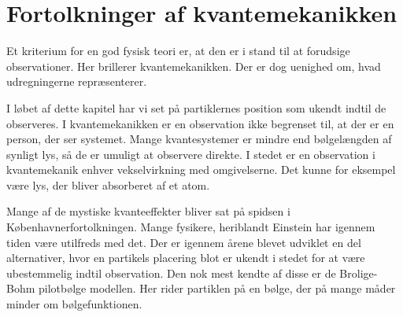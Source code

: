 \documentclass[../Kvantemekanik.tex]{subfiles}
\begin{document}
\section{Fortolkninger af kvantemekanikken}

Et kriterium for en god fysisk teori er, at den er i stand til at forudsige observationer. Her brillerer kvantemekanikken. Der er dog uenighed om, hvad udregningerne repræsenterer.

I løbet af dette kapitel har vi set på partiklernes position som ukendt indtil de observeres. I kvantemekanikken er en observation ikke begrenset til, at der er en person, der ser systemet. Mange kvantesystemer er mindre end bølgelængden af synligt lys, så de er umuligt at observere direkte. I stedet er en observation i kvantemekanik enhver vekselvirkning med omgivelserne. Det kunne for eksempel være lys, der bliver absorberet af et atom.

Mange af de mystiske kvanteeffekter bliver sat på spidsen i Københavnerfortolkningen. Mange fysikere, heriblandt Einstein har igennem tiden være utilfreds med det. Der er igennem årene blevet udviklet en del alternativer, hvor en partikels placering blot er ukendt i stedet for at være ubestemmelig indtil observation.
Den nok mest kendte af disse er de Brolige-Bohm pilotbølge modellen. Her rider partiklen på en bølge, der på mange måder minder om bølgefunktionen.
\end{document}

